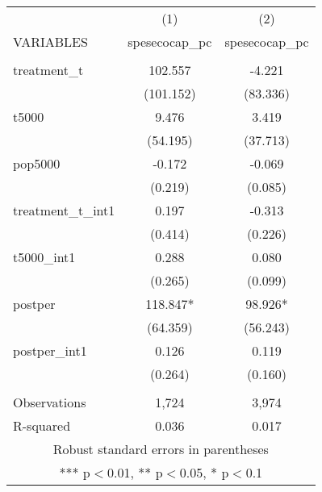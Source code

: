 \documentclass[]{article}
\begin{document}
\begin{tabular}{lcc} \hline
 & (1) & (2) \\
VARIABLES & spesecocap\_pc & spesecocap\_pc \\ \hline
 &  &  \\
treatment\_t & 102.557 & -4.221 \\
 & (101.152) & (83.336) \\
t5000 & 9.476 & 3.419 \\
 & (54.195) & (37.713) \\
pop5000 & -0.172 & -0.069 \\
 & (0.219) & (0.085) \\
treatment\_t\_int1 & 0.197 & -0.313 \\
 & (0.414) & (0.226) \\
t5000\_int1 & 0.288 & 0.080 \\
 & (0.265) & (0.099) \\
postper & 118.847* & 98.926* \\
 & (64.359) & (56.243) \\
postper\_int1 & 0.126 & 0.119 \\
 & (0.264) & (0.160) \\
 &  &  \\
Observations & 1,724 & 3,974 \\
 R-squared & 0.036 & 0.017 \\ \hline
\multicolumn{3}{c}{ Robust standard errors in parentheses} \\
\multicolumn{3}{c}{ *** p$<$0.01, ** p$<$0.05, * p$<$0.1} \\
\end{tabular}
\end{document}
